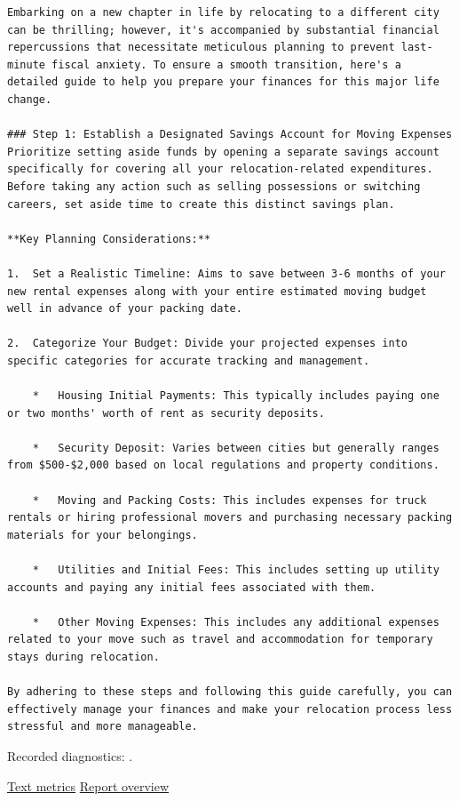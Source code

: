 \begin{Verbatim}
Embarking on a new chapter in life by relocating to a different city can be thrilling; however, it's accompanied by substantial financial repercussions that necessitate meticulous planning to prevent last-minute fiscal anxiety. To ensure a smooth transition, here's a detailed guide to help you prepare your finances for this major life change.

### Step 1: Establish a Designated Savings Account for Moving Expenses
Prioritize setting aside funds by opening a separate savings account specifically for covering all your relocation-related expenditures. Before taking any action such as selling possessions or switching careers, set aside time to create this distinct savings plan.

**Key Planning Considerations:**

1.  Set a Realistic Timeline: Aims to save between 3-6 months of your new rental expenses along with your entire estimated moving budget well in advance of your packing date.

2.  Categorize Your Budget: Divide your projected expenses into specific categories for accurate tracking and management.

    *   Housing Initial Payments: This typically includes paying one or two months' worth of rent as security deposits.

    *   Security Deposit: Varies between cities but generally ranges from $500-$2,000 based on local regulations and property conditions.

    *   Moving and Packing Costs: This includes expenses for truck rentals or hiring professional movers and purchasing necessary packing materials for your belongings.

    *   Utilities and Initial Fees: This includes setting up utility accounts and paying any initial fees associated with them.

    *   Other Moving Expenses: This includes any additional expenses related to your move such as travel and accommodation for temporary stays during relocation.

By adhering to these steps and following this guide carefully, you can effectively manage your finances and make your relocation process less stressful and more manageable.
\end{Verbatim}

Recorded diagnostics:
\texttt{}.

\href{records/docs/watermarking/text.tex}{Text metrics} \textbar{}
\href{../docs/watermarking/README.md}{Report overview}
